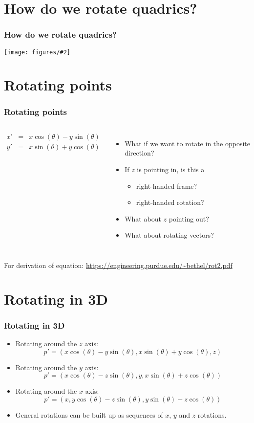 \documentclass[slidestop,xcolor=pst]{beamer}
\newcommand{\mygraphc}[2]{\centerline{\texttt{[image: figures/\#2]}}}
\newcommand{\sect}[1]{
\section{#1}
\begin{frame}[fragile]\frametitle{#1}
}
\newcommand{\bi}{\begin{itemize}}
\newcommand{\ei}{\end{itemize}}
\begin{document}
\sect{How do we rotate quadrics?}
\mygraphc{0.7}{rotatedellipsoids.png}
\end{frame}

\sect{Rotating points}
\begin{columns}
  \begin{eqnarray*}
    x' &=& x\cos(\theta) - y\sin(\theta)\\
    y' &=& x\sin(\theta) + y\cos(\theta)
  \end{eqnarray*}
  \pause
  \begin{itemize}
    \item What if we want to rotate in the opposite direction? \pause
  \item If $z$ is pointing in, is this a
    \begin{itemize}
    \item right-handed frame?
    \item right-handed rotation?
    \end{itemize}
    \pause
  \item What about $z$ pointing out?
    \pause
  \item What about rotating vectors?
    \pause
  \end{itemize}
\end{columns}

\vfill
For derivation of equation:
\url{https://engineering.purdue.edu/~bethel/rot2.pdf}

\end{frame}

\sect{Rotating in 3D}
\bi
\item Rotating around the $z$ axis:
  \[
  p' = (x\cos(\theta) - y\sin(\theta), x\sin(\theta) + y\cos(\theta), z)
  \]
\item Rotating around the $y$ axis:
  \[
  p' = (x\cos(\theta) - z\sin(\theta), y, x\sin(\theta) + z\cos(\theta))
  \]
\item Rotating around the $x$ axis:
  \[
  p' = (x, y\cos(\theta) - z\sin(\theta), y\sin(\theta) + z\cos(\theta))
  \]
\item General rotations can be built up as sequences of $x$, $y$ and
  $z$ rotations.
  \ei
\end{frame}
\end{document}
